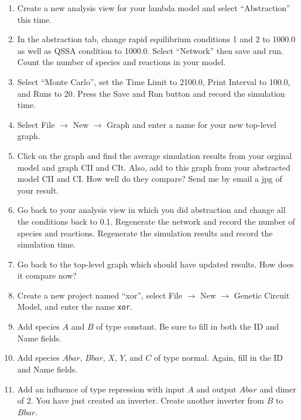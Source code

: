 \documentclass[titlepage,11pt]{article}
\begin{document}
\begin{enumerate}
\item Create a new analysis view for your lambda model and 
      select  ``Abstraction'' this time.  

\item In the abstraction tab, change rapid equilibrium conditions 1 and 2 
      to 1000.0 as well as QSSA condition to 1000.0.  Select ``Network'' then 
      save and run.  Count the number of species and reactions in your model.

\item Select ``Monte Carlo'', set the Time Limit to 2100.0, Print Interval to
      100.0, and Runs to 20.  Press the Save and Run button and record the
      simulation time.

\item Select File $\rightarrow$ New $\rightarrow$ Graph and enter a name for
      your new top-level graph.

\item Click on the graph and find the average simulation results from your
      orginal model and graph CII and CIt.  Also, add to this graph from
      your abstracted model CII and CI.  How well do they compare?  
      Send me by email a jpg of your result.

\item Go back to your analysis view in which you did abstraction and change
      all the conditions back to 0.1.  Regenerate the network and record the
      number of species and reactions.  Regenerate the simulation results and
      record the simulation time.  

\item Go back to the top-level graph which should have updated results.  
      How does it compare now?
\item Create a new project named ``xor'',
      select File $\rightarrow$ New $\rightarrow$ Genetic Circuit Model, 
      and enter the name {\tt xor}.

\item Add species $A$ and $B$ of type constant.  Be sure to fill in both
      the ID and Name fields.

\item Add species $Abar$, $Bbar$, $X$, $Y$, and $C$ of type normal.  Again,
      fill in the ID and Name fields.

\item Add an influence of type repression with input $A$ and output $Abar$ and 
      dimer of 2.  You have just created an inverter.
      Create another inverter from $B$ to $Bbar$.


\end{enumerate}
\end{document}
